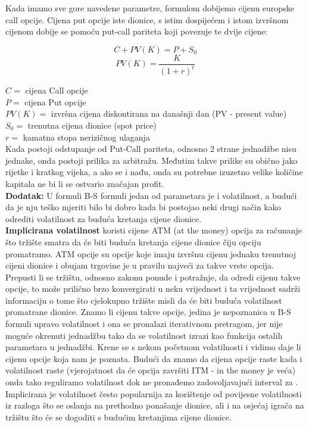 \documentclass[times, utf8, seminar]{fer}
\begin{document}
\noindent Kada imamo sve gore navedene parametre, formulom dobijemo cijenu europske call opcije. Cijena put opcije iste dionice, s istim dospijećem i istom izvršnom cijenom dobije se pomoću put-call pariteta koji povezuje te dvije cijene:

    \[ C + PV(K) = P + S_0 \]
    \[ PV(K) = \frac{K}{(1+r)^t} \]

\noindent $C =$ cijena Call opcije \\
$P =$ cijena Put opcije \\
$PV(K) =$ izvršna cijena diskontirana na današnji dan (PV - present value)\\
$S_0 =$ trenutna cijena dionice (spot price)\\
$r =$ kamatna stopa nerizičnog ulaganja \\

Kada postoji odstupanje od Put-Call pariteta, odnosno 2 strane jednadžbe nisu jednake, onda postoji prilika za arbitražu. Međutim takve prilike su obično jako rijetke i kratkog vijeka, a ako se i nađu, onda su potrebne izuzetno velike količine kapitala ne bi li se ostvario značajan profit.\\

\noindent\textbf{Dodatak:}
U formuli B-S formuli jedan od parametara je i volatilnost, a budući da je nju teško mjeriti bilo bi dobro kada bi postojao neki drugi način kako odrediti volatilnost za buduća kretanja cijene dionice.\\

\textbf{Implicirana volatilnost}  koristi cijene ATM (at the money) opcija za računanje što tržište smatra da će biti buduća kretanja cijene dionice čiju opciju promatramo. ATM opcije su opcije koje imaju izvršnu cijenu jednaku trenutnoj cijeni dionice i obujam trgovine je u pravilu najveći za takve vrste opcija. Prepusti li se tržištu, odnosno zakonu ponude i potražnje, da odredi cijenu takve opcije, to može prilično brzo konvergirati u neku vrijednost i ta vrijednost sadrži informaciju o tome što cjelokupno tržište misli da će biti buduća volatilnost promatrane dionice. Znamo li cijenu takve opcije, jedina je nepoznanica u B-S formuli upravo volatilnost i ona se pronalazi iterativnom pretragom, jer nije moguće okrenuti jednadžbu tako da se volatilnost izrazi kao funkcija ostalih parametara u jednadžbi. Krene se s nekom početnom volatilnosti i vidimo daje li cijenu opcije koja nam je poznata. Budući da znamo da cijena opcije raste kada i volatilnost raste (vjerojatnost da će opcija završiti ITM - in the money je veća) onda tako reguliramo volatilnost dok ne pronađemo zadovoljavajući interval za . Implicirana je volatilnost često popularnija za korištenje od povijesne volatilnosti iz razloga što se oslanja na prethodno ponašanje dionice, ali i na osjećaj igrača na tržištu što će se dogoditi s budućim kretanjima cijene dionice.
\end{document}
